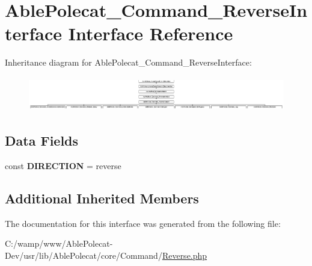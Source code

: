 \hypertarget{interface_able_polecat___command___reverse_interface}{}\section{Able\+Polecat\+\_\+\+Command\+\_\+\+Reverse\+Interface Interface Reference}
\label{interface_able_polecat___command___reverse_interface}
Inheritance diagram for Able\+Polecat\+\_\+\+Command\+\_\+\+Reverse\+Interface\+:\begin{figure}[H]
\begin{center}
\leavevmode
\includegraphics[height=1.514196cm]{interface_able_polecat___command___reverse_interface}
\end{center}
\end{figure}
\subsection*{Data Fields}
\begin{DoxyCompactItemize}
\item 
\hypertarget{interface_able_polecat___command___reverse_interface_ad3beabcf9bd583f082d33e2971b96b3d}{}const {\bfseries D\+I\+R\+E\+C\+T\+I\+O\+N} = \textquotesingle{}reverse\textquotesingle{}\label{interface_able_polecat___command___reverse_interface_ad3beabcf9bd583f082d33e2971b96b3d}

\end{DoxyCompactItemize}
\subsection*{Additional Inherited Members}


The documentation for this interface was generated from the following file\+:\begin{DoxyCompactItemize}
\item 
C\+:/wamp/www/\+Able\+Polecat-\/\+Dev/usr/lib/\+Able\+Polecat/core/\+Command/\hyperlink{_reverse_8php}{Reverse.\+php}\end{DoxyCompactItemize}
